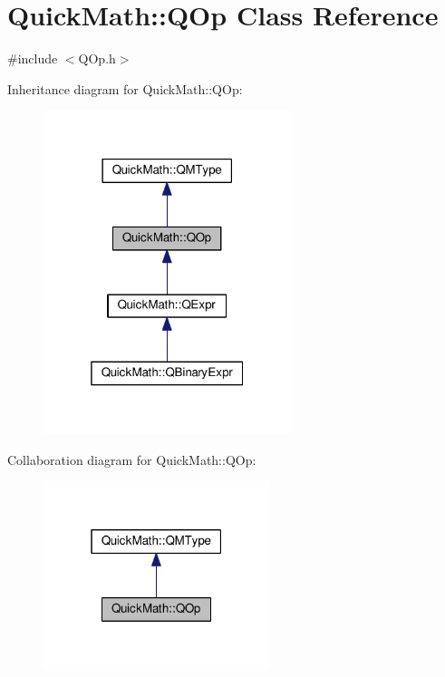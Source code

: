 \hypertarget{classQuickMath_1_1QOp}{}\section{Quick\+Math\+:\+:Q\+Op Class Reference}
\label{classQuickMath_1_1QOp}


{\ttfamily \#include $<$Q\+Op.\+h$>$}



Inheritance diagram for Quick\+Math\+:\+:Q\+Op\+:
\nopagebreak
\begin{figure}[H]
\begin{center}
\leavevmode
\includegraphics[width=205pt]{classQuickMath_1_1QOp__inherit__graph}
\end{center}
\end{figure}


Collaboration diagram for Quick\+Math\+:\+:Q\+Op\+:
\nopagebreak
\begin{figure}[H]
\begin{center}
\leavevmode
\includegraphics[width=187pt]{classQuickMath_1_1QOp__coll__graph}
\end{center}
\end{figure}

